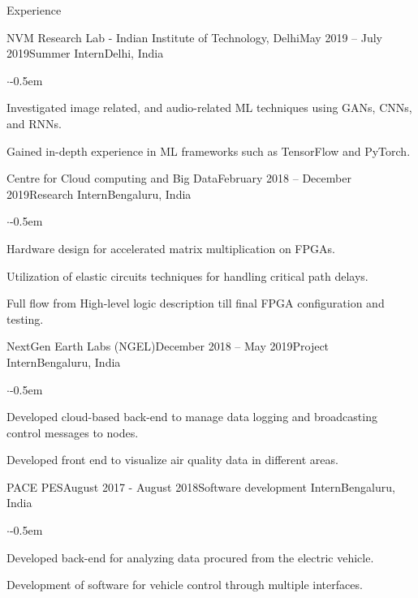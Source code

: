 \documentclass{CV} %
\begin{document}
\begin{rSection}{Experience}
  \begin{rSubsection}{NVM Research Lab - Indian Institute of Technology, Delhi}{May 2019 -- July 2019}{Summer Intern}{Delhi, India}
    \begin{list}{$\cdot$}{\footnotesize}\itemsep -0.5em \vspace{-0.5em}
      \item Investigated image related, and audio-related ML techniques using GANs, CNNs, and RNNs.
      \item Gained in-depth experience in ML frameworks such as TensorFlow and PyTorch.
    \end{list}
  \end{rSubsection}

  \begin{rSubsection}{Centre for Cloud computing and Big Data}{February 2018 -- December 2019}{Research Intern}{Bengaluru, India}
    \begin{list}{$\cdot$}{\footnotesize}\itemsep -0.5em \vspace{-0.5em}
      \item Hardware design for accelerated matrix multiplication on FPGAs.
      \item Utilization of elastic circuits techniques for handling critical path delays.
      \item Full flow from High-level logic description till final FPGA configuration and testing.
    \end{list}
  \end{rSubsection}

  \begin{rSubsection}{NextGen Earth Labs (NGEL)}{December 2018 -- May 2019}{Project Intern}{Bengaluru, India}
    \begin{list}{$\cdot$}{\footnotesize}\itemsep -0.5em \vspace{-0.5em}
      \item Developed cloud-based back-end to manage data logging and broadcasting control messages to nodes.
      \item Developed front end to visualize air quality data in different areas.
    \end{list}
  \end{rSubsection}

  \begin{rSubsection}{PACE PES}{August 2017 - August 2018}{Software development Intern}{Bengaluru, India}
    \begin{list}{$\cdot$}{\footnotesize}\itemsep -0.5em \vspace{-0.5em}
      \item Developed back-end for analyzing data procured from the electric vehicle.
      \item Development of software for vehicle control through multiple interfaces.
    \end{list}
  \end{rSubsection}
  
\end{rSection}
\end{document}
